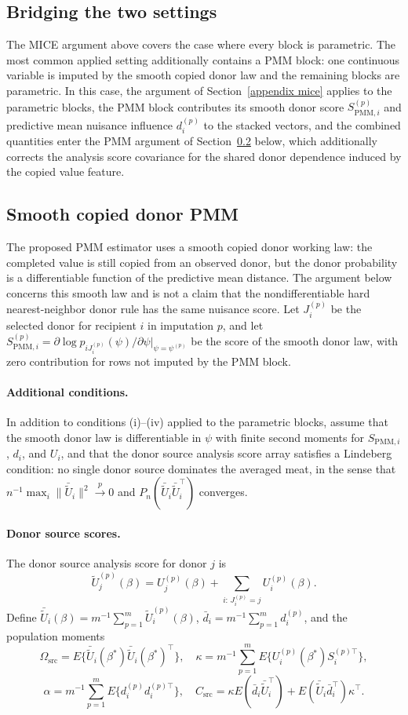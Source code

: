 \subsection{Bridging the two settings}
The MICE argument above covers the case where every block is parametric.
The most common applied setting additionally contains a PMM block: one
continuous variable is imputed by the smooth copied donor law and the
remaining blocks are parametric.  In this case, the argument of
Section~\ref{appendix mice} applies to the parametric blocks, the PMM
block contributes its smooth donor score \(S_{\mathrm{PMM},i}^{(p)}\)
and predictive mean nuisance influence \(d_i^{(p)}\) to the stacked
vectors, and the combined quantities enter the PMM argument of
Section~\ref{appendix pmm} below, which additionally corrects the
analysis score covariance for the shared donor dependence induced by
the copied value feature.
\subsection{Smooth copied donor PMM}\label{appendix pmm}
The proposed PMM estimator uses a smooth copied donor working law: the
completed value is still copied from an observed donor, but the donor
probability is a differentiable function of the predictive mean
distance.  The argument below concerns this smooth law and is not a
claim that the nondifferentiable hard nearest-neighbor donor rule has
the same nuisance score.
Let \(J_i^{(p)}\) be the selected donor for recipient \(i\) in
imputation \(p\), and let
\(S_{\mathrm{PMM},i}^{(p)}
=\partial\log p_{iJ_i^{(p)}}(\psi)/\partial\psi\big|_{\psi=\psi^{(p)}}\)
be the score of the smooth donor law, with zero contribution for rows
not imputed by the PMM block.
\paragraph{Additional conditions.}
In addition to conditions (i)--(iv) applied to the parametric blocks,
assume that the smooth donor law is differentiable in \(\psi\) with
finite second moments for \(S_{\mathrm{PMM},i}\), \(d_i\), and
\(U_i\), and that the donor source analysis score array satisfies a
Lindeberg condition: no single donor source dominates the averaged
meat, in the sense that
\(n^{-1}\max_i\|\bar{\widetilde U}_i\|^2\overset{p}{\to}0\)
and \(P_n(\bar{\widetilde U}_i\bar{\widetilde U}_i^\top)\) converges.
\paragraph{Donor source scores.}
The donor source analysis score for donor \(j\) is
\[
\widetilde U_j^{(p)}(\beta)
=
U_j^{(p)}(\beta)+\sum_{i:\,J_i^{(p)}=j}U_i^{(p)}(\beta).
\]
Define
\(\bar{\widetilde U}_i(\beta)=m^{-1}\sum_{p=1}^m\widetilde U_i^{(p)}(\beta)\),
\(\bar d_i=m^{-1}\sum_{p=1}^m d_i^{(p)}\), and the population moments
\[
\Omega_{\mathrm{src}}
=E\{\bar{\widetilde U}_i(\beta^\ast)\bar{\widetilde U}_i(\beta^\ast)^\top\},
\quad
\kappa=m^{-1}\sum_{p=1}^m E\{U_i^{(p)}(\beta^\ast)S_i^{(p)\top}\},
\]
\[
\alpha=m^{-1}\sum_{p=1}^m E\{d_i^{(p)}d_i^{(p)\top}\},
\quad
C_{\mathrm{src}}
=\kappa E(\bar d_i\bar{\widetilde U}_i^\top)
+E(\bar{\widetilde U}_i\bar d_i^\top)\kappa^\top.
\]
